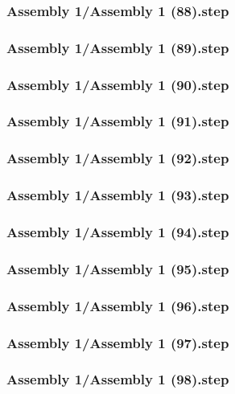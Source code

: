 \documentclass[a4paper,12pt]{article}
\begin{document}
\subsubsection{Assembly 1/Assembly 1 (88).step}

\subsubsection{Assembly 1/Assembly 1 (89).step}

\subsubsection{Assembly 1/Assembly 1 (90).step}

\subsubsection{Assembly 1/Assembly 1 (91).step}

\subsubsection{Assembly 1/Assembly 1 (92).step}

\subsubsection{Assembly 1/Assembly 1 (93).step}

\subsubsection{Assembly 1/Assembly 1 (94).step}

\subsubsection{Assembly 1/Assembly 1 (95).step}

\subsubsection{Assembly 1/Assembly 1 (96).step}

\subsubsection{Assembly 1/Assembly 1 (97).step}

\subsubsection{Assembly 1/Assembly 1 (98).step}

\end{document}
